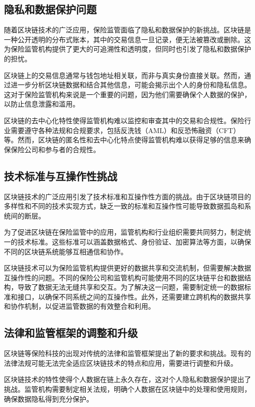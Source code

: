 \documentclass[a4paper,12pt]{ctexart}
\begin{document}
\subsection{隐私和数据保护问题}
随着区块链技术的广泛应用，保险监管面临了隐私和数据保护的新挑战。区块链是一种公开透明的分布式账本，其中的交易信息一旦记录，便无法被篡改或删除。这为保险监管机构提供了更大的可追溯性和透明度，但同时也引发了隐私和数据保护的担忧。

区块链上的交易信息通常与钱包地址相关联，而非与真实身份直接关联。然而，通过进一步分析区块链数据和结合其他信息，可能会揭示出个人的身份和隐私信息。这对于保险监管机构来说是一个重要的问题，因为他们需要确保个人数据的保护，以防止信息泄露和滥用。

区块链的去中心化特性使得监管机构难以监控和审查其中的交易和合规性。保险行业需要遵守各种法规和合规要求，包括反洗钱（AML）和反恐怖融资（CFT）等。然而，区块链的匿名性和去中心化特点使得监管机构难以获得足够的信息来确保保险公司和参与者的合规性。
\subsection{技术标准与互操作性挑战}
区块链技术的广泛应用引发了技术标准和互操作性方面的挑战。由于区块链项目的多样性和不同的技术实现方式，缺乏一致的标准和互操作性可能导致数据孤岛和系统间的断层。

为了促进区块链在保险监管中的应用，监管机构和行业组织需要共同努力，制定统一的技术标准。这些标准可以涵盖数据格式、身份验证、加密算法等方面，以确保不同的区块链系统能够互相通信和协作。

区块链技术可以为保险监管机构提供更好的数据共享和交流机制，但需要解决数据互操作性的问题。不同的保险公司和监管机构可能使用不同的区块链平台和数据结构，导致了数据无法无缝共享和交互。为了解决这一问题，需要制定统一的数据标准和接口，以确保不同系统之间的互操作性。此外，还需要建立跨机构的数据共享和协作机制，以促进监管数据的有效整合和利用。

\subsection{法律和监管框架的调整和升级}
区块链等保险科技的出现对传统的法律和监管框架提出了新的要求和挑战。现有的法律法规可能无法完全适应区块链技术的特点和应用，需要进行调整和升级。

区块链技术的特性使得个人数据在链上永久存在，这对个人隐私和数据保护提出了挑战。监管机构需要制定相关法规，明确个人数据在区块链中的处理和使用规则，确保数据隐私得到充分保护。
\end{document}
